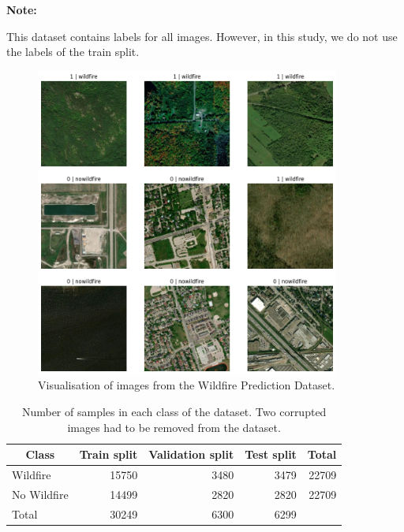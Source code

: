 \documentclass{article}
\begin{document}
\noindent
\begin{minipage}[!hc]{0.12\textwidth}
    \begin{flushleft}
        \textbf{Note:}
    \end{flushleft}
\end{minipage}
\vrule\enskip\vrule\quad\begin{minipage}{\dimexpr 0.87\textwidth-0.8pt-1.5em}
    This dataset contains labels for all images. However, in this study, we do not use the labels of the train split.
\end{minipage}

\begin{figure}[]
    \centering
    \includegraphics[width=10cm]{img/data.png}
    \caption{Visualisation of images from the Wildfire Prediction Dataset.}
    \label{data}
\end{figure}

\begin{table}[]
    \centering
    \begin{tabular}{|l|r|r|r|r|}
    \hline
    \multicolumn{1}{|c|}{Class} & \multicolumn{1}{c|}{Train split} & \multicolumn{1}{c|}{Validation split} & \multicolumn{1}{c|}{Test split} & \multicolumn{1}{c|}{Total} \\ \hline
    Wildfire                    & 15750                            & 3480                                  & 3479                            & 22709                      \\ \hline
    No Wildfire                 & 14499                            & 2820                                  & 2820                            & 22709                      \\ \hline
    Total                       & 30249                            & 6300                                  & 6299                            &                            \\ \hline
    \end{tabular}
    \caption{Number of samples in each class of the dataset. Two corrupted images had to be removed from the dataset.}
    \label{tab_1}
\end{table}
\end{document}
